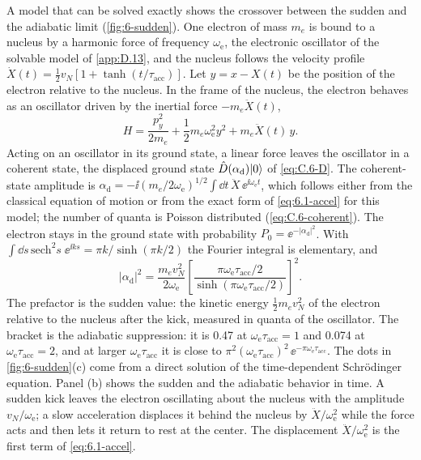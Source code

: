 A model that can be solved exactly shows the crossover between the sudden and the adiabatic limit (\cref{fig:6-sudden}). One electron of mass $m_e$ is bound to a nucleus by a harmonic force of frequency $\omega_{\mathrm{e}}$, the electronic oscillator of the solvable model of \cref{app:D.13}, and the nucleus follows the velocity profile $\dot X(t) = \tfrac12v_N[1 + \tanh(t/\tau_{\mathrm{acc}})]$. Let $y = x - X(t)$ be the position of the electron relative to the nucleus. In the frame of the nucleus, the electron behaves as an oscillator driven by the inertial force $-m_e\ddot X(t)$,
\begin{equation*}
  H = \frac{p_y^2}{2m_e} + \frac12m_e\omega_{\mathrm{e}}^2y^2 + m_e\ddot X(t)\,y .
\end{equation*}
Acting on an oscillator in its ground state, a linear force leaves the oscillator in a coherent state, the displaced ground state $\hat{D}(\alpha_{\mathrm{d}})|0\rangle$ of \cref{eq:C.6-D}. The coherent-state amplitude is $\alpha_{\mathrm{d}} = -\ii(m_e/2\omega_{\mathrm{e}})^{1/2}\int\dd t\,\ddot X\,\ee^{\ii\omega_{\mathrm{e}}t}$, which follows either from the classical equation of motion or from the exact form of \cref{eq:6.1-accel} for this model; the number of quanta is Poisson distributed (\cref{eq:C.6-coherent}). The electron stays in the ground state with probability $P_0 = \ee^{-|\alpha_{\mathrm{d}}|^2}$. With $\int\dd s\,\mathrm{sech}^2s\;\ee^{\ii ks} = \pi k/\sinh(\pi k/2)$ the Fourier integral is elementary, and
\begin{equation}
  |\alpha_{\mathrm{d}}|^2 = \frac{m_ev_N^2}{2\omega_{\mathrm{e}}}\left[\frac{\pi\omega_{\mathrm{e}}\tau_{\mathrm{acc}}/2}{\sinh(\pi\omega_{\mathrm{e}}\tau_{\mathrm{acc}}/2)}\right]^2 .
  \label{eq:6.1-model}
\end{equation}
The prefactor is the sudden value: the kinetic energy $\tfrac12m_ev_N^2$ of the electron relative to the nucleus after the kick, measured in quanta of the oscillator. The bracket is the adiabatic suppression: it is 0.47 at $\omega_{\mathrm{e}}\tau_{\mathrm{acc}} = 1$ and 0.074 at $\omega_{\mathrm{e}}\tau_{\mathrm{acc}} = 2$, and at larger $\omega_{\mathrm{e}}\tau_{\mathrm{acc}}$ it is close to $\pi^2(\omega_{\mathrm{e}}\tau_{\mathrm{acc}})^2\,\ee^{-\pi\omega_{\mathrm{e}}\tau_{\mathrm{acc}}}$. The dots in \cref{fig:6-sudden}(c) come from a direct solution of the time-dependent Schr\"odinger equation. Panel (b) shows the sudden and the adiabatic behavior in time. A sudden kick leaves the electron oscillating about the nucleus with the amplitude $v_N/\omega_{\mathrm{e}}$; a slow acceleration displaces it behind the nucleus by $\ddot X/\omega_{\mathrm{e}}^2$ while the force acts and then lets it return to rest at the center. The displacement $\ddot X/\omega_{\mathrm{e}}^2$ is the first term of \cref{eq:6.1-accel}.

